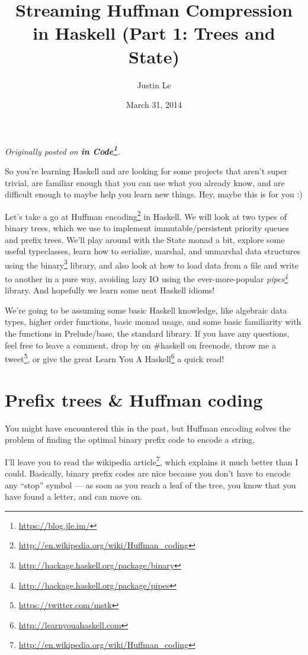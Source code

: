 \documentclass[]{article}
\title{Streaming Huffman Compression in Haskell (Part 1: Trees and State)}
\author{Justin Le}
\date{March 31, 2014}
\renewcommand{\href}[2]{#2\footnote{\url{#1}}}
\begin{document}
\maketitle

\emph{Originally posted on \textbf{\href{https://blog.jle.im/}{in
Code}}.}

So you're learning Haskell and are looking for some projects that aren't
super trivial, are familiar enough that you can use what you already
know, and are difficult enough to maybe help you learn new things. Hey,
maybe this is for you :)

Let's take a go at
\href{http://en.wikipedia.org/wiki/Huffman_coding}{Huffman encoding} in
Haskell. We will look at two types of binary trees, which we use to
implement immutable/persistent priority queues and prefix trees. We'll
play around with the State monad a bit, explore some useful typeclasses,
learn how to serialize, marshal, and unmarshal data structures using the
\href{http://hackage.haskell.org/package/binary}{binary} library, and
also look at how to load data from a file and write to another in a pure
way, avoiding lazy IO using the ever-more-popular
\emph{\href{http://hackage.haskell.org/package/pipes}{pipes}} library.
And hopefully we learn some neat Haskell idioms!

We're going to be assuming some basic Haskell knowledge, like algebraic
data types, higher order functions, basic monad usage, and some basic
familiarity with the functions in Prelude/base, the standard library. If
you have any questions, feel free to leave a comment, drop by on
\#haskell on freenode, throw me a
\href{https://twitter.com/mstk}{tweet}, or give the great
\href{http://learnyouahaskell.com}{Learn You A Haskell} a quick read!

\section{Prefix trees \& Huffman
coding}\label{prefix-trees-huffman-coding}

You might have encountered this in the past, but Huffman encoding solves
the problem of finding the optimal binary prefix code to encode a
string.

I'll leave you to read
\href{http://en.wikipedia.org/wiki/Huffman_coding}{the wikipedia
article}, which explains it much better than I could. Basically, binary
prefix codes are nice because you don't have to encode any ``stop''
symbol --- as soon as you reach a leaf of the tree, you know that you
have found a letter, and can move on.
\end{document}
